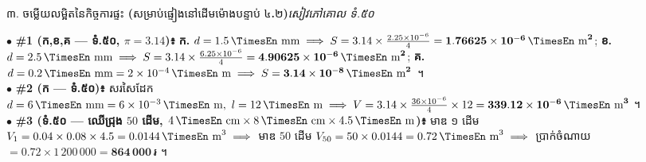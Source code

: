 \documentclass[a4paper,10pt]{article}
\newcommand{\en}[1]{{\TimesEn #1}}
\newcommand{\enbf}[1]{{\TimesEn\bfseries #1}}
\newcommand{\unit}[1]{\,\text{\en{#1}}}
\newcommand{\riel}{\,\text{៛}}
\newcommand{\secstrip}[2]{%
  \vspace{3pt}%
  \begin{tcolorbox}[
    enhanced, sharp corners, colback=panelgray, colframe=black,
    boxrule=0.8pt, boxsep=0.8pt, top=2pt, bottom=2pt, left=5pt, right=5pt,
    after skip=3pt
  ]
    {\muol\fontsize{8.5pt}{12.2pt}\selectfont #1}\hfill{\fontsize{7.8pt}{10.8pt}\selectfont\textit{#2}}
  \end{tcolorbox}%
}
\begin{document}
\vspace{4pt}
\secstrip{៣. ចម្លើយលម្អិតនៃកិច្ចការផ្ទះ \enbf{(}សម្រាប់ផ្ទៀងនៅដើមម៉ោងបន្ទាប់ ៤\enbf{.}២\enbf{)}}{សៀវភៅគោល ទំ.៥០}

\begin{tcolorbox}[
  enhanced, sharp corners, colback=white, colframe=black,
  boxrule=0.8pt, boxsep=2pt, top=4pt, bottom=4pt, left=6pt, right=6pt
]
  \fontsize{8.9pt}{13.4pt}\selectfont
  $\bullet$ \textbf{\#1 (ក,ខ,គ — ទំ.៥០, $\pi = 3.14$)៖} \textbf{ក.} $d = 1.5\unit{mm} \implies S = 3.14\times \frac{2.25\times 10^{-6}}{4} = \mathbf{1.76625\times 10^{-6}\unit{m}^2}$; \quad \textbf{ខ.} $d = 2.5\unit{mm} \implies S = 3.14\times \frac{6.25\times 10^{-6}}{4} = \mathbf{4.90625\times 10^{-6}\unit{m}^2}$; \quad \textbf{គ.} $d = 0.2\unit{mm} = 2\times 10^{-4}\unit{m} \implies S = \mathbf{3.14\times 10^{-8}\unit{m}^2}$ ។\\[2pt]
  $\bullet$ \textbf{\#2 (ក — ទំ.៥០)៖} សរសៃដែក $d = 6\unit{mm} = 6\times 10^{-3}\unit{m}, \ l = 12\unit{m} \implies V = 3.14\times \frac{36\times 10^{-6}}{4}\times 12 = \mathbf{339.12\times 10^{-6}\unit{m}^3}$ ។\\[2pt]
  $\bullet$ \textbf{\#3 (ទំ.៥០ — ឈើជ្រុង $50$ ដើម, $4\unit{cm}\times 8\unit{cm}\times 4.5\unit{m}$)៖} មាឌ ១ ដើម $V_1 = 0.04\times 0.08\times 4.5 = 0.0144\unit{m}^3 \implies$ មាឌ $50$ ដើម $V_{50} = 50\times 0.0144 = 0.72\unit{m}^3 \implies$ ប្រាក់ចំណាយ $= 0.72\times 1\,200\,000 = \mathbf{864\,000\riel}$ ។
\end{tcolorbox}
\end{document}
